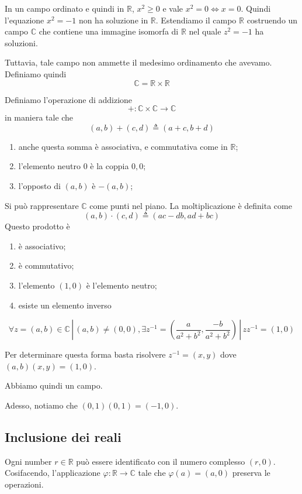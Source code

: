 \documentclass[a4paper]{article}
\begin{document}
In un campo ordinato e quindi in \(\mathbb{R}\), \(x^2 \geq 0\) e vale \(x^2 = 0 \iff x=0\).
Quindi l'equazione \(x^2 = -1\) non ha soluzione in \(\mathbb{R}\).
Estendiamo il campo \(\mathbb{R}\) costruendo un campo \(\mathbb{C}\)
che contiene una immagine isomorfa di \(\mathbb{R}\) nel quale \(z^2 = -1\)
ha soluzioni.

Tuttavia, tale campo non ammette il medesimo ordinamento che avevamo.
Definiamo quindi
\[
    \mathbb{C} = \mathbb{R} \times \mathbb{R}
\]

Definiamo l'operazione di addizione
\[
    +\colon \mathbb{C} \times \mathbb{C} \to \mathbb{C}
\]
in maniera tale che
\[
    (a,b) + (c,d) \triangleq (a+c, b+d)
\]

\begin{enumerate}
    \item anche questa somma è associativa, e commutativa come in \(\mathbb{R}\);
    \item l'elemento neutro \(0\) è la coppia \(0,0\);
    \item l'opposto di \((a,b)\) è \(-(a,b)\);
\end{enumerate}

Si può rappresentare \(\mathbb{C}\) come punti nel piano.
La moltiplicazione è definita come
\[
    (a,b) \cdot (c,d) \triangleq (ac-db,ad+bc)
\]
Questo prodotto è
\begin{enumerate}
    \item è associativo;
    \item è commutativo;
    \item l'elemento \((1,0)\) è l'elemento neutro;
    \item esiste un elemento inverso
\end{enumerate}

\[
    \forall z=(a,b) \in \mathbb{C} \,|\, (a,b) \neq (0,0),
    \exists z^{-1} = \left(\frac{a}{a^2 + b^2}, \frac{-b}{a^2 + b^2}\right) \,|\,
    zz^{-1} = (1,0)
\]

Per determinare questa forma basta risolvere \(z^{-1} = (x,y)\) dove \((a,b)(x,y) = (1,0)\).

Abbiamo quindi un campo.

Adesso, notiamo che \((0,1)(0,1) = (-1, 0)\).

\subsection{Inclusione dei reali}

Ogni number \(r\in\mathbb{R}\) può essere identificato con il numero complesso \((r, 0)\).
Cosifacendo, l'applicazione \(\varphi\colon \mathbb{R} \to \mathbb{C}\)
tale che \(\varphi(a) = (a,0)\) preserva le operazioni.
\end{document}
